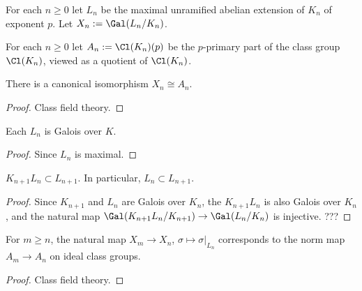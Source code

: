 \begin{definition}
\label{Zp-ext-Ln}
\leanok
For each $n\geq 0$ let $L_n$ be the
maximal unramified abelian extension of $K_n$
of exponent $p$.
Let $X_n:=\Gal(L_n/K_n)$.
\end{definition}

\begin{definition}
\label{Zp-ext-An}
For each $n\geq 0$ let $A_n:=\Cl(K_n)(p)$ be the
$p$-primary part of the class group $\Cl(K_n)$,
viewed as a quotient of $\Cl(K_n)$.
\end{definition}

\begin{prop}
\label{Xn-isom-An}
\leanok
There is a canonical isomorphism $X_n\cong A_n$.
\end{prop}

\begin{proof}
\leanok
Class field theory.
\end{proof}

\begin{lem}
\label{Ln-K-Gal}
\leanok
Each $L_n$ is Galois over $K$.
\end{lem}

\begin{proof}
Since $L_n$ is maximal.
\end{proof}

\begin{lem}
\label{Ln-mono}
$K_{n+1}L_n\subset L_{n+1}$. In particular, $L_n\subset L_{n+1}$.
\end{lem}

\begin{proof}
Since $K_{n+1}$ and $L_n$ are Galois over $K_n$,
the $K_{n+1}L_n$ is also Galois over $K_n$,
and the natural map
$\Gal(K_{n+1}L_n/K_{n+1})\to\Gal(L_n/K_n)$ is injective.
???
\end{proof}

\begin{prop}
\label{Xn-map-eq-An-map}
For $m\geq n$, the natural map $X_m\to X_n$, $\sigma\mapsto\sigma|_{L_n}$
corresponds to the norm map $A_m\to A_n$ on ideal class groups.
\end{prop}

\begin{proof}
Class field theory.
\end{proof}

